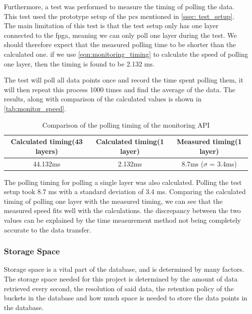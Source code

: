 \documentclass[main.tex]{subfiles}
\begin{document}
Furthermore, a test was performed to measure the timing of polling the data. This test used the prototype setup of the \gls{pcs} mentioned in \autoref{ssec: test_setup}. The main limitation of this test is that the test setup only has one layer connected to the \gls{fpga}, meaning we can only poll one layer during the test. We should therefore expect that the measured polling time to be shorter than the calculated one. if we use \autoref{eqn:monitoring_timing} to calculate the speed of polling one layer, then the timing is found to be 2.132 ms.

The test will poll all data points once and record the time spent polling them, it will then repeat this process 1000 times and find the average of the data. The results, along with comparison of the calculated values is shown in \autoref{tab:monitor_speed}.

\begin{table}[h]
\centering
\begin{tabular}{||c c c||} 
 \hline
  Calculated timing(43 layers) & Calculated timing(1 layer) & Measured timing(1 layer) \\ [0.5ex] 
 \hline\hline
    44.132ms & 2.132ms & 8.7ms ($\sigma$ = 3.4ms) \\  [1ex] 
 \hline
\end{tabular}
\caption{\label{tab:monitor_speed} Comparison of the polling timing of the monitoring API}
\end{table}
\FloatBarrier

The polling timing for polling a single layer was also calculated. Polling the test setup took 8.7 ms with a standard deviation of 3.4 ms. Comparing the calculated timing of polling one layer with the measured timing, we can see that the measured speed fits well with the calculations. the discrepancy between the two values can be explained by the time measurement method not being completely accurate to the data transfer. 

\subsubsection{Storage Space}
Storage space is a vital part of the database, and is determined by many factors. The storage space needed for this project is determined by the amount of data retrieved every second, the resolution of said data, the retention policy of the buckets in the database and how much space is needed to store the data points in the database.
\end{document}
